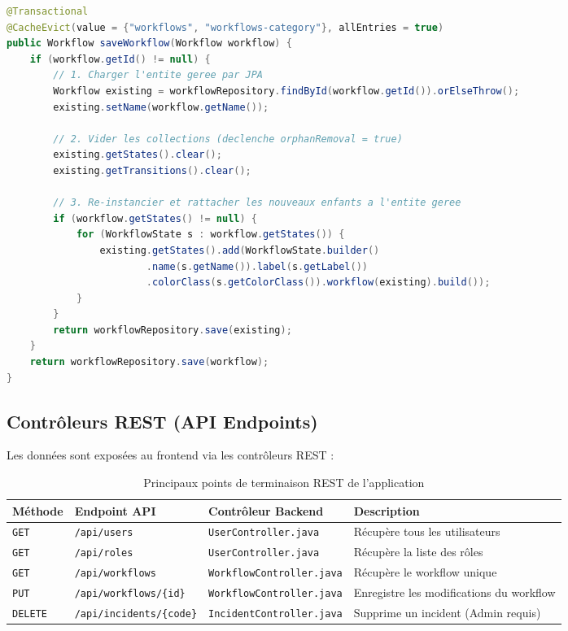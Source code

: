 \documentclass[11pt,a4paper]{article}
\begin{document}
\begin{lstlisting}[language=Java, caption=Résolution de la persistance des entités détachées]
@Transactional
@CacheEvict(value = {"workflows", "workflows-category"}, allEntries = true)
public Workflow saveWorkflow(Workflow workflow) {
    if (workflow.getId() != null) {
        // 1. Charger l'entite geree par JPA
        Workflow existing = workflowRepository.findById(workflow.getId()).orElseThrow();
        existing.setName(workflow.getName());
        
        // 2. Vider les collections (declenche orphanRemoval = true)
        existing.getStates().clear();
        existing.getTransitions().clear();
        
        // 3. Re-instancier et rattacher les nouveaux enfants a l'entite geree
        if (workflow.getStates() != null) {
            for (WorkflowState s : workflow.getStates()) {
                existing.getStates().add(WorkflowState.builder()
                        .name(s.getName()).label(s.getLabel())
                        .colorClass(s.getColorClass()).workflow(existing).build());
            }
        }
        return workflowRepository.save(existing);
    }
    return workflowRepository.save(workflow);
}
\end{lstlisting}

\subsection{Contrôleurs REST (API Endpoints)}
Les données sont exposées au frontend via les contrôleurs REST :

\begin{table}[H]
\centering
\small
\begin{tabular}{llll}
\toprule
\textbf{Méthode} & \textbf{Endpoint API} & \textbf{Contrôleur Backend} & \textbf{Description} \\
\midrule
\texttt{GET} & \texttt{/api/users} & \texttt{UserController.java} & Récupère tous les utilisateurs \\
\texttt{GET} & \texttt{/api/roles} & \texttt{UserController.java} & Récupère la liste des rôles \\
\texttt{GET} & \texttt{/api/workflows} & \texttt{WorkflowController.java} & Récupère le workflow unique \\
\texttt{PUT} & \texttt{/api/workflows/\{id\}} & \texttt{WorkflowController.java} & Enregistre les modifications du workflow \\
\texttt{DELETE} & \texttt{/api/incidents/\{code\}} & \texttt{IncidentController.java} & Supprime un incident (Admin requis) \\
\bottomrule
\end{tabular}
\caption{Principaux points de terminaison REST de l'application}
\end{table}
\end{document}
